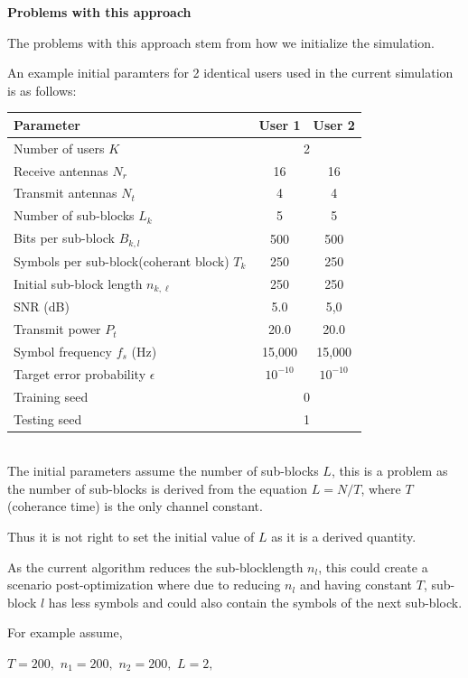 \documentclass[a4paper, 12pt, onecolumn, journal, twoside, draftclsnofoot]{IEEEtran}
\begin{document}
\newpage
\textbf{Problems with this approach}

The problems with this approach stem from how we initialize the simulation.

An example initial paramters for 2 identical users used in the current simulation is as follows:

\begin{tabular}{|l|c|c|}
\hline
\textbf{Parameter} & \textbf{User 1} & \textbf{User 2} \\
\hline
Number of users $K$ & \multicolumn{2}{c|}{2} \\
\hline
Receive antennas $N_r$ & 16 & 16 \\
Transmit antennas $N_t$ & 4 & 4 \\
\hline
Number of sub-blocks $L_k$ & 5 & 5 \\
Bits per sub-block $B_{k,l}$ & 500 & 500 \\
\hline
Symbols per sub-block(coherant block) $T_{k}$ & 250 & 250 \\
Initial sub-block length $n_{k,\ell}$ & 250 & 250 \\
\hline
SNR (dB) & 5.0 & 5,0 \\
Transmit power $P_t$ & 20.0 & 20.0 \\
\hline
Symbol frequency $f_s$ (Hz) & 15{,}000 & 15{,}000 \\
Target error probability $\epsilon$ & $10^{-10}$ & $10^{-10}$ \\
\hline
Training seed & \multicolumn{2}{c|}{0} \\
Testing seed & \multicolumn{2}{c|}{1} \\
\hline 
\end{tabular} \\


The initial parameters assume the number of sub-blocks $L$, this is a problem as the number of sub-blocks is derived from the equation $L = N/T$, where $T$ (coherance time) is the only channel constant.

Thus it is not right to set the initial value of $L$ as it is a derived quantity.

As the current algorithm reduces the sub-blocklength $n_{l}$,  this could create a scenario post-optimization where due to reducing $n_l$ and having constant $T$, sub-block $l$ has less symbols and could also contain the symbols of the next sub-block.

For example assume,

$T = 200,$
$n_1 = 200,$
$n_2 = 200,$
$L = 2,$
\end{document}
